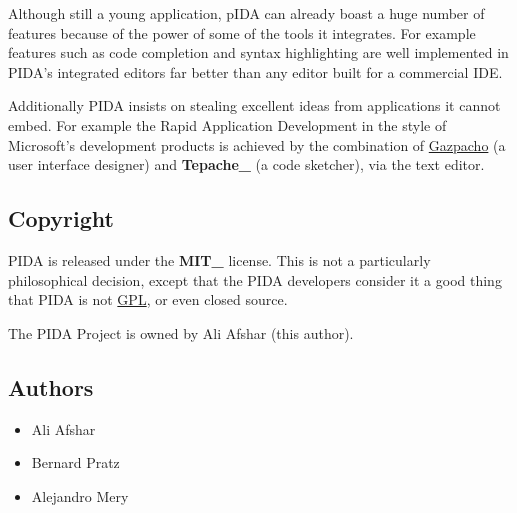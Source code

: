 \documentclass[10pt,a4paper,english]{article}
\begin{document}
Although still a young application, pIDA can already boast a huge number of
features because of the power of some of the tools it integrates. For example
features such as code completion and syntax highlighting are well implemented in
PIDA's integrated editors far better than any editor built for a commercial
IDE.

Additionally PIDA insists on stealing excellent ideas from applications it
cannot embed. For example the Rapid Application Development in the style of
Microsoft's development products is achieved by the combination of \href{http://gazpacho.sicem.biz/}{Gazpacho} (a
user interface designer) and {\color{red}\bfseries{}Tepache{\_}} (a code sketcher), via the text editor.



\hypertarget{copyright}{}
\subsection*{Copyright}

PIDA is released under the {\color{red}\bfseries{}MIT{\_}} license. This is not a particularly philosophical
decision, except that the PIDA developers consider it a good thing that PIDA is
not \href{http://www.opensource.org/licenses/gpl-license.php}{GPL}, or even closed source.

The PIDA Project is owned by Ali Afshar (this author).



\hypertarget{authors}{}
\subsection*{Authors}
\begin{itemize}
\item {} 
Ali Afshar

\item {} 
Bernard Pratz

\item {} 
Alejandro Mery

\end{itemize}



\hypertarget{contributors}{}
\end{document}
